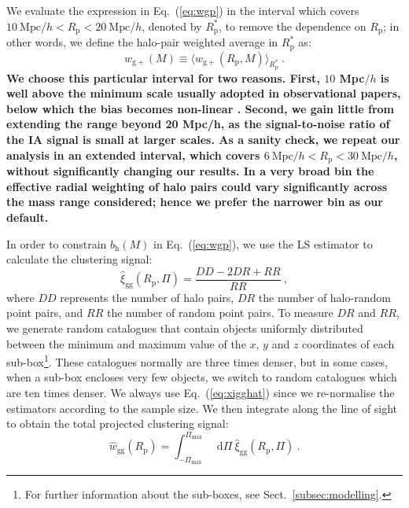 \documentclass[a4paper,fleqn,usenatbib]{mnras}
\newcommand*\dif{\mathop{}\!\mathrm{d}} 	%
\newenvironment{correction}
 {\bfseries}%
  {}%
\begin{document}
We evaluate the expression in Eq.~(\ref{eq:wgp}) in the interval which covers $10\ \mathrm{Mpc}/h < R_{\mathrm{p}} < 20 \ \mathrm{Mpc}/h$, denoted by $R_{\mathrm{p}}^*$, to remove the dependence on $R_{\mathrm{p}}$; in other words, we define the halo-pair weighted average in $R_{\mathrm{p}}^*$ as:
\begin{equation}
    w_{\mathrm{g+}} (M) \equiv \langle w_{\mathrm{g+}} (R_{\mathrm{p}}, M) \rangle _{R_{\mathrm{p}}^*} \ .
	\label{eq:wgpmass}
\end{equation}
\begin{correction}
We choose this particular interval for two reasons. First, $10$ Mpc$/h$ is well above the minimum scale usually adopted in observational papers, below which the bias becomes non-linear \citep{Tasitsiomietal2004, Mandelbaumetal2006}. Second, we gain little from extending the range beyond 20 Mpc/h, as the signal-to-noise ratio of the IA signal is small at larger scales. As a sanity check, we repeat our analysis in an extended interval, which covers $6\ \mathrm{Mpc}/h < R_{\mathrm{p}} < 30 \ \mathrm{Mpc}/h$, without significantly changing our results. In a very broad bin the effective radial weighting of halo pairs could vary significantly across the mass range considered; hence we prefer the narrower bin as our default.
\end{correction}

In order to constrain $b_{\mathrm{h}} (M)$ in Eq.~(\ref{eq:wgp}), we use the LS \citep{LandySzalay1993} estimator to calculate the clustering signal:
\begin{equation}
    \hat{\xi}_{\mathrm{gg}}(R_{\mathrm{p}}, \Pi) = \frac{DD -2DR + RR}{RR} \ ,
	\label{eq:xigghat}
\end{equation}
where $DD$ represents the number of halo pairs, $DR$ the number of halo-random point pairs, and $RR$ the number of random point pairs. To measure $DR$ and $RR$, we generate random catalogues that contain objects uniformly distributed between the minimum and maximum value of the $x$, $y$ and $z$ coordinates of each sub-box\footnote{For further information about the sub-boxes, see Sect.~\ref{subsec:modelling}.}. These catalogues normally are three times denser, but in some cases, when a sub-box encloses very few objects, we switch to random catalogues which are ten times denser. We always use Eq.~(\ref{eq:xigghat}) since we re-normalise the estimators according to the sample size. We then integrate along the line of sight to obtain the total projected clustering signal:
\begin{equation}
   \hat{w}_{\mathrm{gg}} (R_{\mathrm{p}}) = \int _{-\Pi_{\mathrm{max}}}^{\Pi_{\mathrm{max}}} \dif \Pi \ \hat{\xi}_{\mathrm{gg}}(R_{\mathrm{p}}, \Pi) \ .
	\label{eq:wgghat}
\end{equation}
\end{document}
